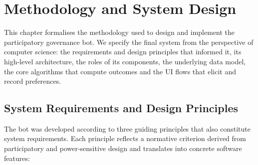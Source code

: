 \doublespacing %

\chapter{Methodology and System Design}
\label{ch:method}

\begin{spacing}{1} %
\minitoc %
\end{spacing} %
\thesisspacing %

This chapter formalises the methodology used to design and implement the
participatory governance bot.  We specify the final system from the perspective of computer science: the requirements and design
principles that informed it, its high‑level architecture, the roles of
its components, the underlying data model, the core algorithms that
compute outcomes and the UI flows that elicit and record
preferences.   

\section{System Requirements and Design Principles}

The bot was developed according to three guiding principles that also
constitute system requirements.  Each principle reflects a normative
criterion derived from participatory and power‑sensitive design and
translates into concrete software features:


